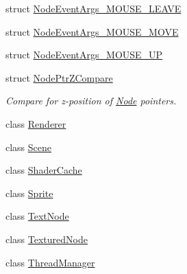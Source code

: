 \begin{DoxyCompactItemize}
struct \mbox{\hyperlink{structsage_1_1NodeEventArgs__MOUSE__LEAVE}{Node\+Event\+Args\+\_\+\+M\+O\+U\+S\+E\+\_\+\+L\+E\+A\+VE}}
\item 
struct \mbox{\hyperlink{structsage_1_1NodeEventArgs__MOUSE__MOVE}{Node\+Event\+Args\+\_\+\+M\+O\+U\+S\+E\+\_\+\+M\+O\+VE}}
\item 
struct \mbox{\hyperlink{structsage_1_1NodeEventArgs__MOUSE__UP}{Node\+Event\+Args\+\_\+\+M\+O\+U\+S\+E\+\_\+\+UP}}
\item 
struct \mbox{\hyperlink{structsage_1_1NodePtrZCompare}{Node\+Ptr\+Z\+Compare}}
\begin{DoxyCompactList}\small\item\em Compare for z-\/position of \mbox{\hyperlink{classsage_1_1Node}{Node}} pointers. \end{DoxyCompactList}\item 
class \mbox{\hyperlink{classsage_1_1Renderer}{Renderer}}
\item 
class \mbox{\hyperlink{classsage_1_1Scene}{Scene}}
\item 
class \mbox{\hyperlink{classsage_1_1ShaderCache}{Shader\+Cache}}
\item 
class \mbox{\hyperlink{classsage_1_1Sprite}{Sprite}}
\item 
class \mbox{\hyperlink{classsage_1_1TextNode}{Text\+Node}}
\item 
class \mbox{\hyperlink{classsage_1_1TexturedNode}{Textured\+Node}}
\item 
class \mbox{\hyperlink{classsage_1_1ThreadManager}{Thread\+Manager}}
\end{DoxyCompactItemize}

